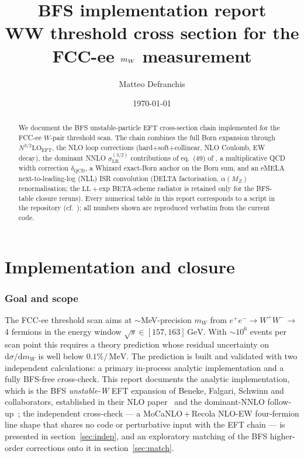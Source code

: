 \documentclass[11pt,a4paper]{article}
\title{BFS implementation report\\
\large WW threshold cross section for the FCC-ee $\mW$ measurement}
\author{Matteo Defranchis}
\date{\today}
\newcommand{\code}[1]{\texttt{\detokenize{#1}}}
\newcommand{\mW}{m_W}
\newcommand{\sqrts}{\sqrt{s}}
\newcommand{\GeV}{\ensuremath{\,\mathrm{GeV}}}
\newcommand{\MeV}{\ensuremath{\,\mathrm{MeV}}}
\begin{document}
\maketitle

\begin{abstract}
We document the BFS unstable-particle EFT cross-section chain implemented
for the FCC-ee $W$-pair threshold scan. The chain combines the full Born
expansion through $N^{3/2}\text{LO}_\text{EFT}$, the NLO loop corrections
(hard$+$soft$+$collinear, NLO Coulomb, EW decay), the dominant NNLO
$\sigma^{(3/2)}_\text{LR}$ contributions of eq.~(49) of \cite{BFSnnlo},
a multiplicative QCD width correction $\delta_\text{QCD}$, a Whizard
exact-Born anchor on the Born sum, and an eMELA next-to-leading-log
(NLL) ISR convolution (DELTA factorisation, $\alpha(M_Z)$
renormalisation; the $\mathrm{LL{+}exp}$ BETA-scheme radiator is retained
only for the BFS-table closure reruns). Every numerical table in this report
corresponds to a script in the repository (cf.~\code{report/README.md});
all numbers shown are reproduced verbatim from the current code.
\end{abstract}

\tableofcontents

\clearpage
\part{Implementation and closure}\label{part:impl}

\section{Goal and scope}

The FCC-ee threshold scan aims at $\sim$MeV-precision $\mW$ from
$e^+e^-\to W^+W^- \to$ 4 fermions in the energy window
$\sqrts\in[157,163]\GeV$. With $\sim 10^6$ events per scan point this
requires a theory prediction whose residual uncertainty on
$\mathrm{d}\sigma/\mathrm{d}\mW$ is well below $0.1\%/\!\MeV$. The
prediction is built and validated with two independent calculations: a
primary in-process analytic implementation and a fully BFS-free
cross-check. This report documents the analytic implementation, which is
the BFS \emph{unstable-W} EFT expansion of Beneke, Falgari, Schwinn and
collaborators, established in their NLO paper~\cite{BFSnlo} and the
dominant-NNLO follow-up~\cite{BFSnnlo}; the independent cross-check ---
a MoCaNLO\,$+$\,Recola NLO-EW four-fermion line shape that shares no code
or perturbative input with the EFT chain --- is presented in
section~\ref{sec:indep}, and an exploratory matching of the BFS
higher-order corrections onto it in section~\ref{sec:match}.
\end{document}
